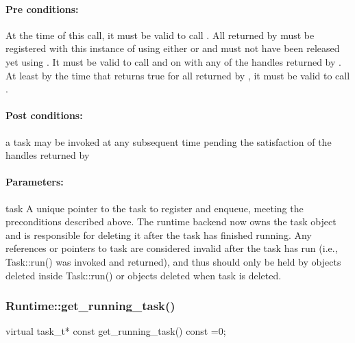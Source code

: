 \paragraph{Pre conditions:} At the time of this call, it must be valid to call
.  All 
       returned by  must be registered
       with this instance of  using either
        or 
         and must not have been released yet using
           .
       It must be valid to call  and
          on  with any of the handles
       returned by .  At least by the time that
          returns
       true for all  returned by
         , it must be valid to call
           .
     
\paragraph{Post conditions:} a task may be invoked at any subsequent time pending the satisfaction of the handles returned
       by 
     
\paragraph{Parameters:} 
\begin{compactdesc}
\item[task] A unique pointer to the task to register and enqueue, meeting the preconditions
       described above.  The runtime backend now owns the task object and is responsible for deleting it
       after the task has finished running.  Any references or pointers to task are considered
       invalid after the task has run (i.e., Task::run() was invoked and returned), and thus should only
       be held by objects deleted inside Task::run() or objects deleted when task is deleted.
\end{compactdesc}
     

\subsubsection{Runtime::get\_running\_task()}
\begin{CppCode}
virtual task_t* const
    get_running_task() const =0;
\end{CppCode}


